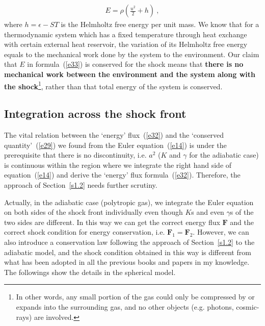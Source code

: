 \documentclass[fleqn,usenatbib]{mnras}
\begin{document}
\begin{gather}
E=\rho\left(\frac{u^{2}}{2}+h\right)\ ,\label{e33}
\end{gather}
where $h=\epsilon-ST$ is the Helmholtz free energy per unit mass. We know that for a thermodynamic system which has a fixed temperature through heat exchange with certain external heat reservoir, the variation of its Helmholtz free energy equals to the mechanical work done by the system to the environment. Our claim that $E$ in formula~(\ref{e33}) is conserved for the shock means that \textbf{there is no mechanical work between the environment and the system along with the shock}\footnote{In other words, any small portion of the gas could only be compressed by or expands into the surrounding gas, and no other objects (e.g. photons, cosmic-rays) are involved.}, rather than that total energy of the system is conserved. 

\subsection{Integration across the shock front}
The vital relation between the `energy' flux~(\ref{e32}) and the `conserved quantity'~(\ref{e29}) we found from the Euler equation~(\ref{e14}) is under the prerequisite that there is no discontinuity, i.e. $a^{2}$ ($K$ and $\gamma$ for the adiabatic case) is continuous within the region where we integrate the right hand side of equation~(\ref{e14}) and derive the `energy' flux formula~(\ref{e32}). Therefore, the approach of Section~\ref{s1.2} needs further scrutiny. 

Actually, in the adiabatic case (polytropic gas), we integrate the Euler equation on both sides of the shock front individually even though $K$s and even $\gamma$s of the two sides are different. In this way we can get the correct energy flux $\mathbf{F}$ and the correct shock condition for energy conservation, i.e. $\mathbf{F}_{1}=\mathbf{F}_{2}$. However, we can also introduce a conservation law following the approach of Section~\ref{s1.2} to the adiabatic model, and the shock condition obtained in this way is different from what has been adopted in all the previous books and papers in my knowledge. The followings show the details in the spherical model.
\end{document}
